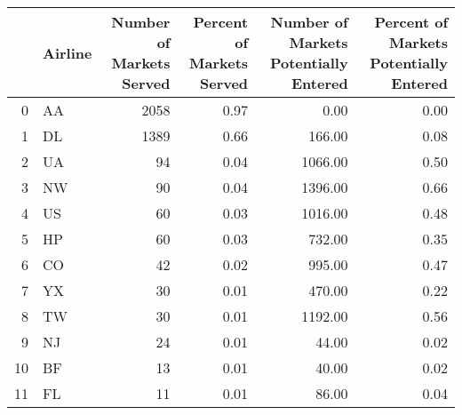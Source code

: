 \begin{tabular}{rlrrrr}
\hline
    & Airline   &   Number of Markets Served &   Percent of Markets Served &   Number of Markets Potentially Entered &   Percent of Markets Potentially Entered \\
\hline
  0 & AA        &                       2058 &                        0.97 &                                    0.00 &                                     0.00 \\
  1 & DL        &                       1389 &                        0.66 &                                  166.00 &                                     0.08 \\
  2 & UA        &                         94 &                        0.04 &                                 1066.00 &                                     0.50 \\
  3 & NW        &                         90 &                        0.04 &                                 1396.00 &                                     0.66 \\
  4 & US        &                         60 &                        0.03 &                                 1016.00 &                                     0.48 \\
  5 & HP        &                         60 &                        0.03 &                                  732.00 &                                     0.35 \\
  6 & CO        &                         42 &                        0.02 &                                  995.00 &                                     0.47 \\
  7 & YX        &                         30 &                        0.01 &                                  470.00 &                                     0.22 \\
  8 & TW        &                         30 &                        0.01 &                                 1192.00 &                                     0.56 \\
  9 & NJ        &                         24 &                        0.01 &                                   44.00 &                                     0.02 \\
 10 & BF        &                         13 &                        0.01 &                                   40.00 &                                     0.02 \\
 11 & FL        &                         11 &                        0.01 &                                   86.00 &                                     0.04 \\

\end{tabular}
